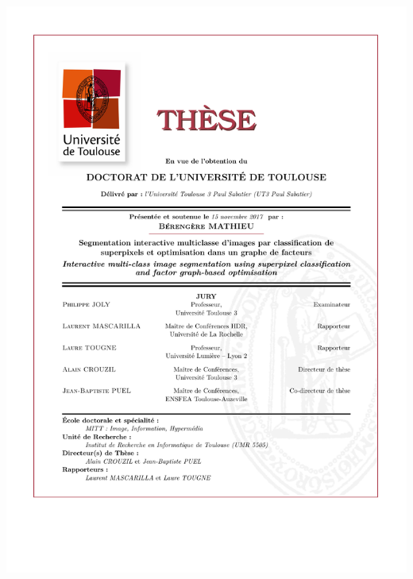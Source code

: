 
\addtocounter{page}{-1}
\thispagestyle{empty}
\begin{center}
\includegraphics[width=\textwidth]{miscpages/cover-page.pdf}
\end{center}
\newpage\thispagestyle{empty}\addtocounter{page}{-1}
